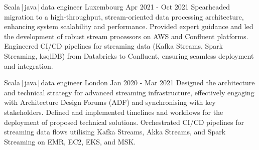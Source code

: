 \begin{cventries}

    \cventry
    {Scala\,|\,java\,|\,data engineer}
    {} %
    {Luxembourg} %
    {Apr 2021 - Oct 2021} %
    {}
    {
        Spearheaded migration to a high-throughput, stream-oriented data processing architecture, enhancing system scalability and performance. Provided expert guidance and led the development of robust stream processors on AWS and Confluent platforms. Engineered CI/CD pipelines for streaming data (Kafka Streams, Spark Streaming, ksqlDB) from Databricks to Confluent, ensuring seamless deployment and integration.
    }

    \cventry
    {Scala\,|\,java\,|\,data engineer}
    {} %
    {London} %
    {Jan 2020 - Mar 2021} %
    {}
    {
        Designed the architecture and technical strategy for advanced streaming infrastructure, effectively engaging with Architecture Design Forums (ADF) and synchronising with key stakeholders. Defined and implemented timelines and workflows for the deployment of proposed technical solutions. Orchestrated CI/CD pipelines for streaming data flows utilising Kafka Streams, Akka Streams, and Spark Streaming on EMR, EC2, EKS, and MSK.
    }

\end{cventries}



